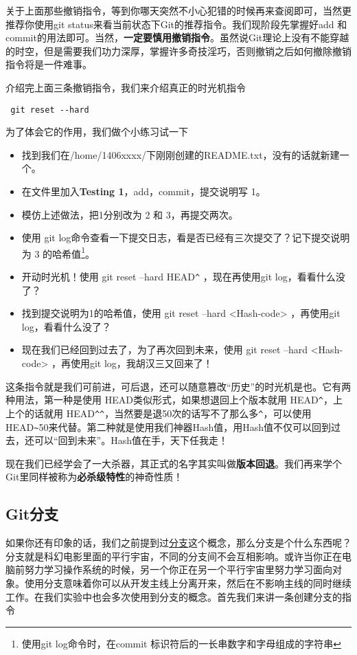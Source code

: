 关于上面那些撤销指令，等到你哪天突然不小心犯错的时候再来查阅即可，当然更推荐你使用git status来看当前状态下Git的推荐指令。我们现阶段先掌握好add 和commit的用法即可。当然，\textbf{一定要慎用撤销指令}。虽然说Git理论上没有不能穿越的时空，但是需要我们功力深厚，掌握许多奇技淫巧，否则撤销之后如何撤除撤销指令将是一件难事。

介绍完上面三条撤销指令，我们来介绍真正的时光机指令

\begin{verbatim}
 git reset --hard
\end{verbatim}

为了体会它的作用，我们做个小练习试一下

\begin{exercise}
	\begin{itemize}
		\item 找到我们在/home/1406xxxx/下刚刚创建的README.txt，没有的话就新建一个。
		\item 在文件里加入\textbf{Testing 1}，add，commit，提交说明写 1。
		\item 模仿上述做法，把1分别改为 2 和 3，再提交两次。
		\item 使用 git log命令查看一下提交日志，看是否已经有三次提交了？记下提交说明为 3 的哈希值\footnote{使用git log命令时，在commit 标识符后的一长串数字和字母组成的字符串}。
		\item 开动时光机！使用 git reset --hard HEAD\verb|^| ，现在再使用git log，看看什么没了？
		\item 找到提交说明为1的哈希值，使用 git reset --hard <Hash-code> ，再使用git log，看看什么没了？
		\item 现在我们已经回到过去了，为了再次回到未来，使用 git reset --hard <Hash-code> ，再使用git log，我胡汉三又回来了！
	\end{itemize}
\end{exercise}

这条指令就是我们可前进，可后退，还可以随意篡改“历史”的时光机是也。它有两种用法，第一种是使用 HEAD类似形式，如果想退回上个版本就用 HEAD\verb|^|，上上个的话就用 HEAD\verb|^|\verb|^|，当然要是退50次的话写不了那么多\verb|^|，可以使用HEAD\verb|~|50来代替。第二种就是使用我们神器Hash值，用Hash值不仅可以回到过去，还可以“回到未来”。Hash值在手，天下任我走！

现在我们已经学会了一大杀器，其正式的名字其实叫做\textbf{版本回退}。我们再来学个Git里同样被称为\textbf{必杀级特性}的神奇性质！

\subsection{Git分支}
如果你还有印象的话，我们之前提到过\hyperref[分支]{分支}这个概念，那么分支是个什么东西呢？分支就是科幻电影里面的平行宇宙，不同的分支间不会互相影响。或许当你正在电脑前努力学习操作系统的时候，另一个你正在另一个平行宇宙里努力学习面向对象。使用分支意味着你可以从开发主线上分离开来，然后在不影响主线的同时继续工作。在我们实验中也会多次使用到分支的概念。首先我们来讲一条创建分支的指令\label{git branch}

